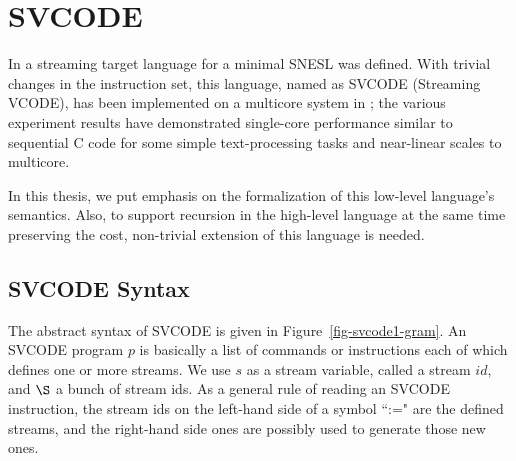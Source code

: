 \section{SVCODE}
In \cite{Fmaster} a streaming target language for a minimal SNESL was defined.
With trivial changes in the instruction set, this language, named as SVCODE (Streaming VCODE), has been implemented on a multicore system in \cite{Fphd}; the various experiment results
have demonstrated single-core performance similar to sequential C code for some simple 
text-processing tasks and near-linear scales to multicore.

In this thesis, we put emphasis on the formalization of this low-level language's semantics.
Also, to support recursion in the high-level language at the same time preserving the cost, non-trivial extension of this language is needed. 

\subsection{SVCODE Syntax}
%


The abstract syntax of SVCODE is given in Figure~\ref{fig-svcode1-gram}.
An SVCODE program $p$ is basically a list of commands or instructions each of which defines one or more streams. 
We use $s$ as a stream variable, called a stream $id$, and $\S$ a bunch of stream ids.
As a general rule of reading an SVCODE instruction, the stream ids on the left-hand side of a symbol ``:=" are the defined streams, and the right-hand side ones are possibly used to generate those new ones.



